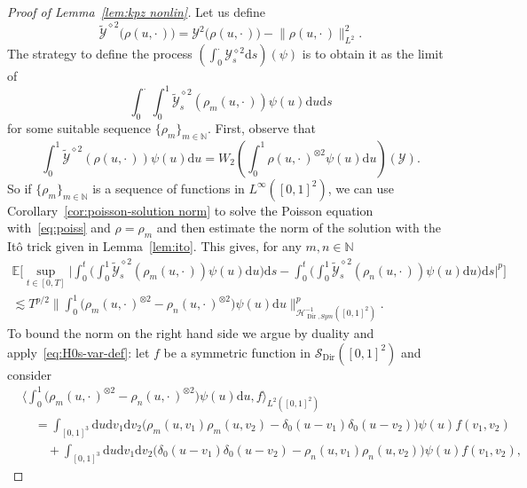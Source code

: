 \documentclass[10pt]{amsart}
\theoremstyle{definition}\newtheorem{defi}[theo]{Definition}\newtheorem{rema}[theo]{Remark}\newtheorem{exam}[theo]{Example}\newtheorem{exem}[theo]{Example}\newtheorem{nota}[theo]{Notation}
\DeclareMathOperator{\Dir}{Dir}
\newcommand{\bb}[1]{{\mathbb #1}}
\newcommand{\mc}[1]{{\mathcal #1}}
\renewcommand{\mc}[1]{{\mathcal #1}}
\newcommand{\SD}{\ensuremath{\mc S_{\Dir}}}
\newcommand*{\dd}{\mathrm{d}}
\newcommand*{\ds}{\dd s}
\newcommand*{\du}{\dd u}
\newcommand*{\dv}{\dd v}
\begin{document}
\begin{proof}[Proof of Lemma~\ref{lem:kpz nonlin}]
Let us define
\[
\widetilde{\mc Y}^{\diamond 2}\big(\rho(u,\cdot\,)\big) = \mc Y^2 \big(\rho (u, \cdot\,)\big) - \big\| \rho (u, \cdot\,) \big\|_{L^2}^2.
\]
The strategy to define the process $(\int_0^\cdot \mc Y_s^{\diamond 2} \ds)(\psi)$ is to obtain it as the limit of
\begin{equation}\label{eq:sequence}
\int_0^\cdot \int_0^1\widetilde{\mc Y}_s^{\diamond 2}(\rho_m(u,\cdot\,))\psi(u)\du \ds
\end{equation}
for some suitable sequence $\{\rho_m\}_{m \in \bb N}$. First, observe that
\begin{equation}\label{eq:poiss}
\int_0^1 \widetilde{\mc Y}^{\diamond 2} (\rho (u, \cdot\,)) \psi (u) \du = W_2
\left(\int_0^1 \rho (u, \cdot\,)^{\otimes 2} \psi (u) \du
\right) (\mc Y).
\end{equation}
So if $\{\rho_m\}_{m \in\mathbb{N}}$ is a sequence of functions in $L^{\infty} ([0, 1]^2)$, we can use Corollary~\ref{cor:poisson-solution norm} to solve the Poisson equation with~\eqref{eq:poiss} and $\rho=\rho_m$ and then estimate the norm of the solution with the It\^o trick given in Lemma~\ref{lem:ito}. This gives, for any $m, n \in \mathbb{N}$
\begin{multline*}
\mathbb{E} \bigg[\sup_{t \in [0, T]} \bigg| \int_0^t \bigg(\int_0^1
\widetilde{\mc Y}^{\diamond 2}_s (\rho_m (u, \cdot\,)) \psi (u) \du \bigg) \ds - \int_0^t \bigg(\int_0^1 \widetilde{\mc Y}^{\diamond 2}_s (\rho_n (u, \cdot\,)) \psi (u) \du \bigg) \ds \bigg|^p \bigg]\\
 \lesssim T^{p / 2} \bigg\| \int_0^1 \big(\rho_m (u, \cdot\,)^{\otimes 2} -
\rho_n(u, \cdot\,)^{\otimes 2} \big) \psi (u) \du \bigg\|_{\mc H^{- 1}_{\Dir, Sym} ([0, 1]^2)}^p.
\end{multline*}
To bound the norm on the right hand side we argue by duality and apply~\eqref{eq:H0s-var-def}: let $f$ be a symmetric function in $\SD ([0, 1]^2)$ and consider
\begin{align*}
&\bigg\langle \int_0^1 \big(\rho_m (u, \cdot\,)^{\otimes 2} - \rho_n (u, \cdot\,)^{\otimes 2}\big) \psi (u) \du, f \bigg\rangle_{L^2 ([0, 1]^2)}\\
&\quad = \int_{[0, 1]^3} \du \dv_1 \dv_2 \big(\rho_m (u, v_1) \rho_m (u, v_2) - \delta_0(u - v_1) \delta_0(u - v_2)\big) \psi (u) f (v_1, v_2)\\
&\qquad+ \int_{[0, 1]^3} \du \dv_1 \dv_2 \big(\delta_0(u - v_1) \delta_0 (u - v_2) - \rho_n (u, v_1) \rho_n (u, v_2)\big) \psi (u) f (v_1, v_2),

\end{align*}
\end{proof}
\end{document}

